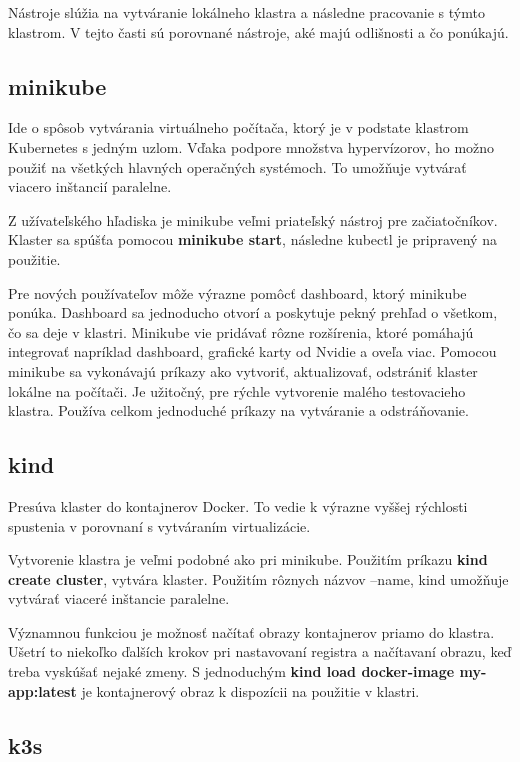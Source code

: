 Nástroje slúžia na vytváranie lokálneho klastra a následne pracovanie s týmto klastrom. V tejto časti sú porovnané nástroje, aké majú odlišnosti a čo ponúkajú.
\subsection*{minikube}

Ide o spôsob vytvárania virtuálneho počítača, ktorý je v podstate klastrom Kubernetes s jedným uzlom. Vďaka podpore množstva hypervízorov, ho možno použiť na všetkých hlavných operačných systémoch. To umožňuje vytvárať viacero inštancií paralelne.

Z užívateľského hľadiska je minikube veľmi priateľský nástroj pre začiatočníkov. Klaster sa spúšťa pomocou \textbf{minikube start}, následne kubectl je pripravený na použitie.

Pre nových používateľov môže výrazne pomôcť dashboard, ktorý minikube ponúka. Dashboard sa jednoducho otvorí a poskytuje pekný prehľad o všetkom, čo sa deje v klastri. Minikube vie pridávať rôzne rozšírenia, ktoré pomáhajú integrovať napríklad dashboard, grafické karty od Nvidie a oveľa viac. Pomocou minikube sa vykonávajú príkazy ako vytvoriť, aktualizovať, odstrániť klaster lokálne na počítači. Je užitočný, pre rýchle vytvorenie malého testovacieho klastra. Používa celkom jednoduché príkazy na vytváranie a odstráňovanie.

\subsection*{kind}

Presúva klaster do kontajnerov Docker. To vedie k výrazne vyššej rýchlosti spustenia v porovnaní s vytváraním virtualizácie.

Vytvorenie klastra je veľmi podobné ako pri minikube. Použitím príkazu \textbf{kind create cluster}, vytvára klaster. Použitím rôznych názvov  --name, kind umožňuje vytvárať viaceré inštancie paralelne.

Významnou funkciou je možnosť načítať obrazy kontajnerov priamo do klastra. Ušetrí to niekoľko ďalších krokov pri nastavovaní registra a načítavaní obrazu, keď treba vyskúšať nejaké zmeny. S jednoduchým \textbf{kind load docker-image my-app:latest} je kontajnerový obraz k dispozícii na použitie v klastri.

\subsection*{k3s}

